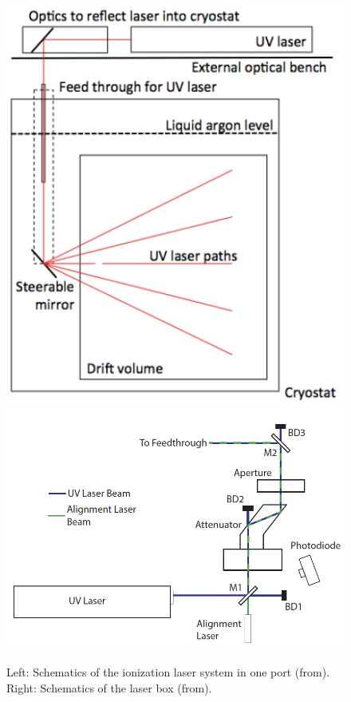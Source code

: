 \begin{figure}[htb!] 
\centering 
\includegraphics[width=0.45\linewidth]{graphics/uB_laser_schematic.png}
\includegraphics[width=0.5\linewidth]{graphics/uB_laser_box.png}
\caption{Left: Schematics of the ionization laser system in one port (from\cite{sbn-prop}). Right: Schematics of the laser box (from\cite{microboone}).}
\label{fig:laser_schematic} 
\end{figure} 


